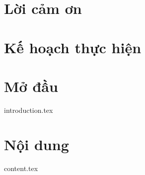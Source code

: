 \documentclass[oneside]{report}
\begin{document}
\pagestyle{fancy}
\chapter*{Lời cảm ơn}
\chapter*{Kế hoạch thực hiện}
\tableofcontents
\cleardoublepage{}
{}
\listoftables
\cleardoublepage{}
{}
\listoffigures
\chapter{Mở đầu}
{introduction.tex}
\chapter{Nội dung}
{content.tex}
\end{document}
